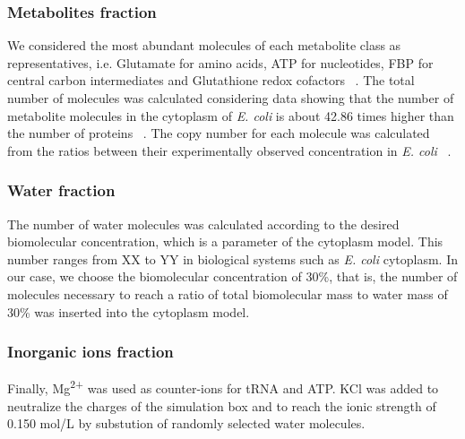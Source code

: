 \documentclass[journal=jacsat,manuscript=article]{achemso}
\begin{document}
\subsubsection{Metabolites fraction}
We considered the most abundant molecules of each metabolite class as representatives, i.e. Glutamate for amino acids, ATP for nucleotides, FBP for central carbon intermediates and Glutathione redox cofactors ~\cite{metabolite_proportion}. The total number of molecules was calculated considering data showing that the number of metabolite molecules in the cytoplasm of \textit{E. coli} is about 42.86 times higher than the number of proteins ~\cite{metabolite_proportion}. The copy number for each molecule was calculated from the ratios between their experimentally observed concentration in {\em E. coli} ~\cite{metabolite_proportion}.

\subsubsection{Water fraction}
The number of water molecules was calculated according to the desired biomolecular concentration, which is a parameter of the cytoplasm model. This number ranges from \colorbox{red!50}{XX to YY} in biological systems such as \textit{E. coli} cytoplasm. In our case, we choose the biomolecular concentration of 30\%, that is, the number of molecules necessary to reach a ratio of total biomolecular mass to water mass of 30\% was inserted into the cytoplasm model.

\subsubsection{Inorganic ions fraction}
Finally, Mg\textsuperscript{2+} was used as counter-ions for tRNA and ATP. KCl was added to neutralize the charges of the simulation box and to reach the ionic strength of 0.150 mol/L by substution of randomly selected water molecules.
\end{document}
